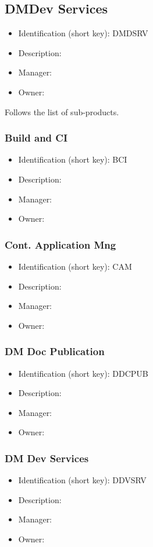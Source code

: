 \subsection{DMDev Services}\label{sect:DMDSRV}
\begin{itemize}
\item Identification (short key): DMDSRV
\item Description: 
\item Manager: 
\item Owner: 
\end{itemize}

Follows the list of sub-products.\subsubsection{Build and CI}\label{sect:BCI}
\begin{itemize}
\item Identification (short key): BCI
\item Description: 
\item Manager: 
\item Owner: 
\end{itemize}

\subsubsection{Cont. Application Mng}\label{sect:CAM}
\begin{itemize}
\item Identification (short key): CAM
\item Description: 
\item Manager: 
\item Owner: 
\end{itemize}

\subsubsection{DM Doc Publication}\label{sect:DDCPUB}
\begin{itemize}
\item Identification (short key): DDCPUB
\item Description: 
\item Manager: 
\item Owner: 
\end{itemize}

\subsubsection{DM Dev Services}\label{sect:DDVSRV}
\begin{itemize}
\item Identification (short key): DDVSRV
\item Description: 
\item Manager: 
\item Owner: 
\end{itemize}


